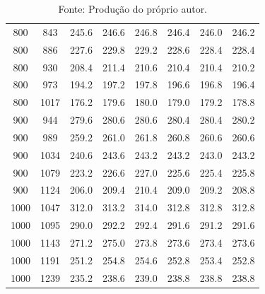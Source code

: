 \begin{table}[ht]
\begin{minipage}{0.48\textwidth}
{\begin{tabular}{|cc|c|c|c|c|c|c|}
800 & 843  & 245.6 &246.6& 246.8 & 246.4 & \cellcolor{blue!20}246.0 & 246.2 \\
800 & 886  & 227.6 &229.8& 229.2 & 228.6 & \cellcolor{blue!20}228.4 & \cellcolor{blue!20}228.4 \\
800 & 930  & 208.4 &211.4& 210.6 & 210.4 & 210.4 & \cellcolor{blue!20}210.2 \\
800 & 973  & 194.2 &197.2& 197.8 & 196.6 & 196.8 & \cellcolor{blue!20}196.4 \\
800 & 1017 & 176.2 &179.6& 180.0 & 179.0 & 179.2 & \cellcolor{blue!20}178.8 \\
900 & 944  & 279.6 &280.6& 280.6 & 280.4 & 280.4 & \cellcolor{blue!20}280.2 \\
900 & 989  & 259.2 &261.0& 261.8 & 260.8 & \cellcolor{blue!20}260.6 & \cellcolor{blue!20}260.6 \\
900 & 1034 & 240.6 &243.6& 243.2 & 243.2 & \cellcolor{blue!20}243.0 & 243.2 \\
900 & 1079 & 223.2 &226.6& 227.0 & 225.6 & \cellcolor{blue!20}225.4 & 225.8 \\
900 & 1124 & 206.0 &209.4& 210.4 & 209.0 & 209.2 & \cellcolor{blue!20}208.8 \\
1000 & 1047& 312.0 &313.2& 314.0 & \cellcolor{blue!20}312.8 & \cellcolor{blue!20}312.8 & \cellcolor{blue!20}312.8 \\
1000 & 1095& 290.0 &292.2& 292.4 & 291.6 & \cellcolor{blue!20}291.2 & 291.6 \\
1000 & 1143& 271.2 &275.0& 273.8 & 273.6 & \cellcolor{blue!20}273.4 & 273.6 \\
1000 & 1191& 251.2 &254.8& 254.6 & \cellcolor{blue!20}252.8 & 253.4 & \cellcolor{blue!20}252.8 \\
1000 & 1239& 235.2 &238.6& 239.0 & \cellcolor{blue!20}238.8 & \cellcolor{blue!20}238.8 & \cellcolor{blue!20}238.8 \\
\hline
\end{tabular}
}
\caption*{\small Fonte: Produção do próprio autor.}
\label{tab:resultados_grandes_comparados}
\end{minipage}
\end{table}










































